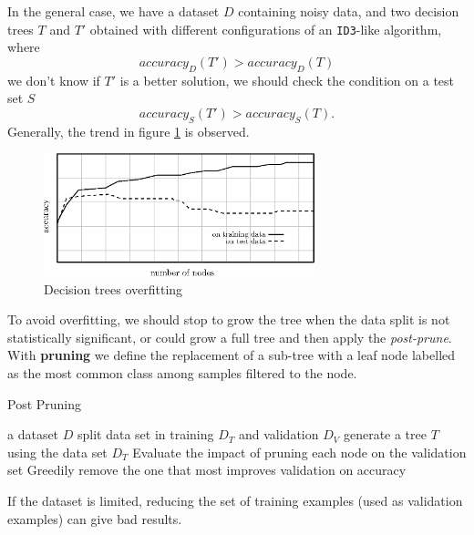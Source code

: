 \documentclass[10pt, letterpaper]{report}
\begin{document}
In the general case, we have a dataset $D$ containing noisy data, and two decision trees $T$ and $T'$ obtained with different configurations of an \texttt{ID3}-like algorithm, where\begin{equation}
	accuracy_D(T')>accuracy_D(T)
\end{equation}
we don't know if $T'$ is a better solution, we should check the condition on a test set $S$\begin{equation}
	accuracy_S(T')>accuracy_S(T).
\end{equation}
Generally, the trend in figure \ref{img:trees_overfitting} is observed.\bigskip

\begin{figure}[h!]
	\centering
	\includegraphics[width=0.7\textwidth]{images/trees_overfitting.eps}
	\caption{Decision trees overfitting}
	\label{img:trees_overfitting}
\end{figure}


To avoid overfitting, we should stop to grow the tree when the data split is not statistically significant, or could grow a full tree and then apply the \textit{post-prune}. With \textbf{pruning} we define the replacement of a sub-tree with a leaf node labelled as the most common class among samples filtered to the node.\bigskip

\begin{algorithm}
	\caption{Post Pruning}\label{alg:pruning}
	\begin{algorithmic}
		\Require a dataset $D$
		\State split data set in training $D_T$ and validation $D_V$
		\State generate a tree $T$ using the data set $D_T$
		\State  Evaluate the impact of pruning each node on the validation set
		\State Greedily remove the one that most improves validation on accuracy
		\EndWhile
	\end{algorithmic}
\end{algorithm}

If the dataset is limited, reducing the set of training examples (used
as validation examples) can give bad results.\bigskip
\end{document}
